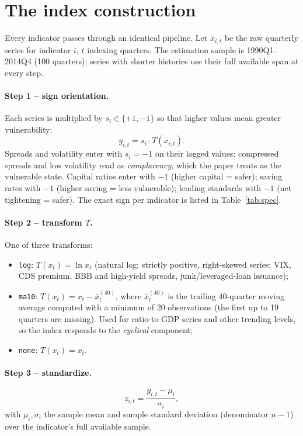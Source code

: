 \documentclass[11pt]{article}
\begin{document}
\section{The index construction}
\label{sec:pipeline}

Every indicator passes through an identical pipeline.  Let $x_{i,t}$ be the
raw quarterly series for indicator $i$, $t$ indexing quarters.  The
estimation sample is 1990Q1--2014Q4 (100 quarters); series with shorter
histories use their full available span at every step.

\paragraph{Step 1 -- sign orientation.}
Each series is multiplied by $s_i \in \{+1,-1\}$ so that higher values mean
greater vulnerability:
\begin{equation}
y_{i,t} = s_i \cdot T(x_{i,t}).
\end{equation}
Spreads and volatility enter with $s_i=-1$ on their logged values:
compressed spreads and low volatility read as \textit{complacency}, which
the paper treats as the vulnerable state.  Capital ratios enter with
$-1$ (higher capital = safer); saving rates with $-1$ (higher saving =
less vulnerable); lending standards with $-1$ (net tightening = safer).
The exact sign per indicator is listed in Table~\ref{tab:spec}.

\paragraph{Step 2 -- transform $T$.}
One of three transforms:
\begin{itemize}[nosep]
\item \texttt{log}: $T(x_t)=\ln x_t$ (natural log; strictly positive,
right-skewed series: VIX, CDS premium, BBB and high-yield spreads,
junk/leveraged-loan issuance);
\item \texttt{ma10}: $T(x_t)=x_t - \bar{x}_{t}^{(40)}$, where
$\bar{x}_{t}^{(40)}$ is the trailing 40-quarter moving average computed
with a minimum of 20 observations (the first up to 19 quarters are
missing).  Used for ratio-to-GDP series and other trending levels, so the
index responds to the \textit{cyclical} component;
\item \texttt{none}: $T(x_t)=x_t$.
\end{itemize}

\paragraph{Step 3 -- standardize.}
\begin{equation}
z_{i,t} = \frac{y_{i,t}-\mu_i}{\sigma_i},
\end{equation}
with $\mu_i,\sigma_i$ the sample mean and sample standard deviation
(denominator $n-1$) over the indicator's full available sample.
\end{document}
